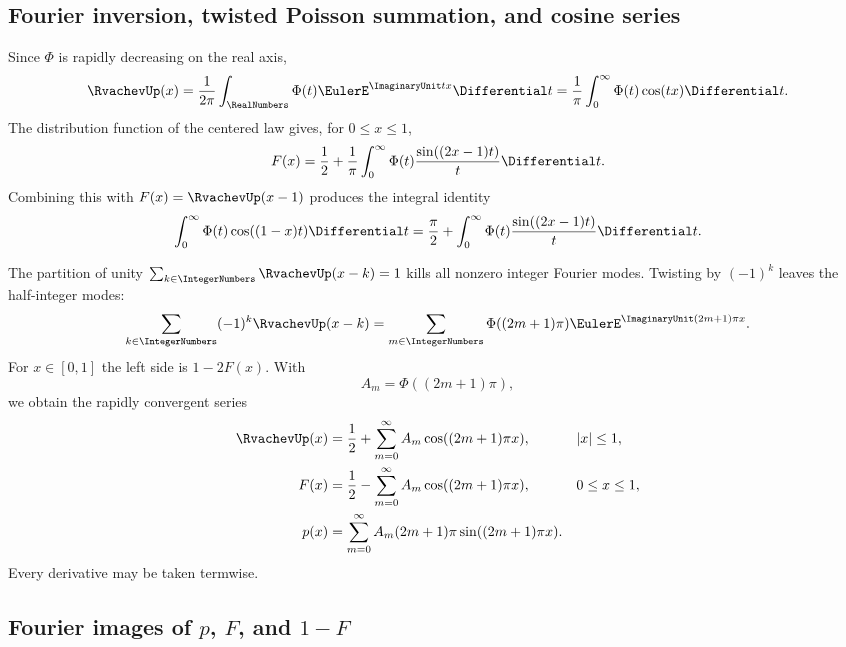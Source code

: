 \documentclass[11pt]{article}
\theoremstyle{definition}
\theoremstyle{remark}
\begin{document}
\subsection{Fourier inversion, twisted Poisson summation, and cosine series}

Since $\Phi$ is rapidly decreasing on the real axis,
\begin{equation}\label{p3:eq:up-Fourier-inversion}
 \RvachevUp(x)=\frac1{2\pi}\int_\RealNumbers\Phi(t)\EulerE^{\ImaginaryUnit tx}\Differential t
 =\frac1\pi\int_0^\infty\Phi(t)\cos(tx)\Differential t.
\end{equation}
The distribution function of the centered law gives, for $0\le x\le1$,
\begin{equation}\label{p3:eq:F-GilPelaez}
 F(x)=\frac12+\frac1\pi\int_0^\infty
 \Phi(t)\frac{\sin((2x-1)t)}{t}\Differential t.
\end{equation}
Combining this with $F(x)=\RvachevUp(x-1)$ produces the integral identity
\begin{equation}\label{p3:eq:sine-cosine-duality}
 \int_0^\infty\Phi(t)\cos((1-x)t)\Differential t
 =\frac\pi2+\int_0^\infty\Phi(t)
   \frac{\sin((2x-1)t)}{t}\Differential t.
\end{equation}

The partition of unity $\sum_{k\in\IntegerNumbers}\RvachevUp(x-k)=1$ kills all nonzero integer
Fourier modes.  Twisting by $(-1)^k$ leaves the half-integer modes:
\begin{equation}\label{p3:eq:twisted-Poisson}
 \sum_{k\in\IntegerNumbers}(-1)^k\RvachevUp(x-k)
 =\sum_{m\in\IntegerNumbers}\Phi((2m+1)\pi)\EulerE^{\ImaginaryUnit(2m+1)\pi x}.
\end{equation}
For $x\in[0,1]$ the left side is $1-2F(x)$.  With
\begin{equation}\label{p3:eq:A_m}
 A_m=\Phi((2m+1)\pi),
\end{equation}
we obtain the rapidly convergent series
\begin{align}
 \RvachevUp(x)&=\frac12+\sum_{m=0}^\infty A_m
          \cos((2m+1)\pi x), &&|x|\le1,\label{p3:eq:up-half-series}\\
 F(x)&=\frac12-\sum_{m=0}^\infty A_m
          \cos((2m+1)\pi x), &&0\le x\le1,\label{p3:eq:F-half-series}\\
 p(x)&=\sum_{m=0}^\infty A_m(2m+1)\pi
          \sin((2m+1)\pi x).\label{p3:eq:p-half-series}
\end{align}
Every derivative may be taken termwise.

\subsection[Fourier images of p, F, and 1-F]{Fourier images of $p$, $F$, and $1-F$}
\end{document}

